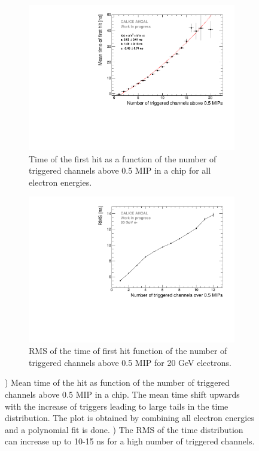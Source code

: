 \begin{figure}[htbp!]
	\begin{subfigure}[t]{0.5\textwidth}
		\centering
		\includegraphics[width=1\textwidth]{../Thesis_Plots/Timing/Electrons/Plots/NumberHits_Dependance_AllEnergies.pdf}
		\caption{Time of the first hit as a function of the number of triggered channels above 0.5 MIP in a chip for all electron energies.}\label{fig:nhits_profile}
	\end{subfigure}
	\hfill
	\begin{subfigure}[t]{0.5\textwidth}
		\centering
		\includegraphics[width=1\textwidth]{../Thesis_Plots/Timing/Electrons/Plots/ParametrisationPedestalShift_20GeV.pdf}
		\caption{RMS of the time of first hit function of the number of triggered channels above 0.5 MIP for 20 GeV electrons.}\label{fig:RMS_nHits}
	\end{subfigure}
	\caption{) Mean time of the hit as function of the number of triggered channels above 0.5 MIP in a chip. The mean time shift upwards with the increase of triggers leading to large tails in the time distribution. The plot is obtained by combining all electron energies and a polynomial fit is done. ) The RMS of the time distribution can increase up to 10-15 ns for a high number of triggered channels.}
\end{figure}

